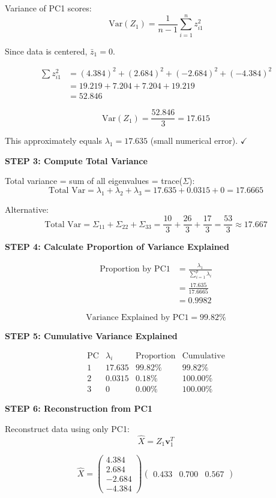 \documentclass[12pt]{article}
\begin{document}
\begin{solution}
Variance of PC1 scores:
\[
\text{Var}(Z_1) = \frac{1}{n-1}\sum_{i=1}^n z_{i1}^2
\]

Since data is centered, $\bar{z}_1 = 0$.

\begin{align*}
\sum z_{i1}^2 &= (4.384)^2 + (2.684)^2 + (-2.684)^2 + (-4.384)^2 \\
&= 19.219 + 7.204 + 7.204 + 19.219 \\
&= 52.846
\end{align*}

\[
\text{Var}(Z_1) = \frac{52.846}{3} = 17.615
\]

This approximately equals $\lambda_1 = 17.635$ (small numerical error). $\checkmark$

\textbf{STEP 3: Compute Total Variance}

Total variance = sum of all eigenvalues = trace($\Sigma$):
\[
\text{Total Var} = \lambda_1 + \lambda_2 + \lambda_3 = 17.635 + 0.0315 + 0 = 17.6665
\]

Alternative:
\[
\text{Total Var} = \Sigma_{11} + \Sigma_{22} + \Sigma_{33} = \frac{10}{3} + \frac{26}{3} + \frac{17}{3} = \frac{53}{3} \approx 17.667
\]

\textbf{STEP 4: Calculate Proportion of Variance Explained}

\begin{align*}
\text{Proportion by PC1} &= \frac{\lambda_1}{\sum_{i=1}^p \lambda_i} \\
&= \frac{17.635}{17.6665} \\
&= 0.9982
\end{align*}

\[
\boxed{\text{Variance Explained by PC1} = 99.82\%}
\]

\textbf{STEP 5: Cumulative Variance Explained}

\[
\begin{array}{c|c|c|c}
\text{PC} & \lambda_i & \text{Proportion} & \text{Cumulative} \\
\hline
1 & 17.635 & 99.82\% & 99.82\% \\
2 & 0.0315 & 0.18\% & 100.00\% \\
3 & 0 & 0.00\% & 100.00\%
\end{array}
\]

\textbf{STEP 6: Reconstruction from PC1}

Reconstruct data using only PC1:
\[
\hat{X} = Z_1 \mathbf{v}_1^T
\]

\[
\hat{X} = \begin{pmatrix}4.384 \\ 2.684 \\ -2.684 \\ -4.384\end{pmatrix}\begin{pmatrix}0.433 & 0.700 & 0.567\end{pmatrix}
\]


\end{solution}
\end{document}
